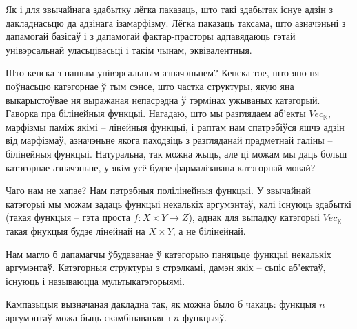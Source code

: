 \documentclass[a4paper,12pt]{book}
\begin{document}
Як і для звычайнага здабытку лёгка паказаць, што такі здабытак існуе
адзін з дакладнасьцю да адзінага ізамарфізму. Лёгка паказаць таксама,
што азначэньні з дапамогай базісаў і з дапамогай фактар-прасторы
адпавядаюць гэтай унівэрсальнай уласьцівасьці і такім чынам,
эквівалентныя.

Што кепска з нашым унівэрсальным азначэньнем? Кепска тое, што яно ня
поўнасьцю катэгорнае ў тым сэнсе, што частка структуры, якую яна
выкарыстоўвае ня выражаная непасрэдна ў тэрмінах ужываных
катэгорый. Гаворка пра білінейныя функцыі. Нагадаю, што мы разглядаем
аб'екты $Vec_{\mathbb{K}}$, марфізмы паміж якімі -- лінейныя функцыі,
і раптам нам спатрэбіўся яшчэ адзін від марфізмаў, азначэньне якога
паходзіць з разгляданай прадметнай галіны -- білінейныя
функцыі. Натуральна, так можна жыць, але ці можам мы даць больш
катэгорнае азначэньне, у якім усё будзе фармалізавана катэгорнай
мовай?

Чаго нам не хапае? Нам патрэбныя полілінейныя функцыі. У звычайнай
катэгорыі мы можам задаць функцыі некалькіх аргумэнтаў, калі існуюць
здабыткі (такая функцыя -- гэта проста $f: X \times Y \rightarrow Z$),
аднак для выпадку катэгорыі $Vec_{\mathbb{K}}$ такая фнукцыя будзе
лінейнай на $X \times Y$, а не білінейнай.

Нам магло б дапамагчы ўбудаванае ў катэгорыю паняцьце функцыі
некалькіх аргумэнтаў. Катэгорныя структуры з стрэлкамі, дамэн якіх --
сьпіс
аб'ектаў, існуюць і называюцца мультыкатэгорыямі.

Кампазыцыя вызначаная дакладна так, як можна было б чакаць: функцыя
$n$ аргумэнтаў можа быць скамбінаваная з $n$ функцыяў.
\end{document}
